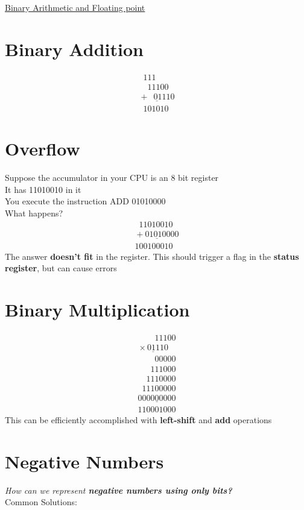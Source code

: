 \documentclass{article}[18pt]
\begin{document}
\begin{center}
\underline{\huge Binary Arithmetic and Floating point}
\end{center}
\section{Binary Addition}
$$
\begin{array}{r}
\phantom{0}111\phantom{000}\\				
\phantom{00}11100\\
\underline{\mbox{} +\phantom{0}01110}\\
\phantom{0}101010
\end{array}
$$
\section{Overflow}
Suppose the accumulator in your CPU is an 8 bit register\\
It has 11010010 in it\\
You execute the instruction ADD 01010000\\
What happens?
$$
\begin{array}{r}			
\phantom{0}11010010\\
\underline{\mbox{} +01010000}\\
100100010
\end{array}
$$
The answer \textbf{doesn't fit} in the register. This should trigger a flag in the \textbf{status register}, but can cause errors
\section{Binary Multiplication}
$$
\begin{array}{r}			
\phantom{0000}11100\\
\underline{\mbox{}\times 01110}\\
\phantom{0000}00000\\
\phantom{000}111000\\
\phantom{00}1110000\\
\phantom{0}11100000\\
\underline{000000000}\\
110001000
\end{array}
$$
This can be efficiently accomplished with \textbf{left-shift} and \textbf{add} operations
\section{Negative Numbers}
\textit{How can we represent \textbf{negative numbers using only bits?}}\\
Common Solutions:
\end{document}

